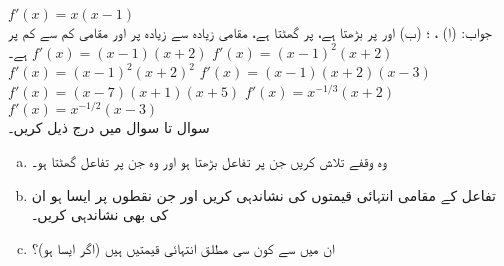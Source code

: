 $f'(x)=x(x-1)$\\
جواب:\quad
(ا) ، ؛ (ب)  اور  پر بڑھتا ہے،  پر گھٹتا ہے، مقامی زیادہ سے زیادہ  پر اور مقامی کم سے کم  پر ہے۔
$f'(x)=(x-1)(x+2)$
$f'(x)=(x-1)^2(x+2)$
$f'(x)=(x-1)^2(x+2)^2$
$f'(x)=(x-1)(x+2)(x-3)$
$f'(x)=(x-7)(x+1)(x+5)$
$f'(x)=x^{-1/3}(x+2)$
$f'(x)=x^{-1/2}(x-3)$
\\
سوال  تا سوال  میں درج ذیل کریں۔
\begin{enumerate}[a.]
\item
وہ وقفے تلاش کریں جن پر تفاعل بڑھتا ہو اور وہ جن پر تفاعل گھٹتا ہو۔
\item
 تفاعل کے مقامی انتہائی قیمتوں کی نشاندہی کریں اور جن نقطوں پر ایسا ہو ان کی بھی نشاندہی کریں۔
\item
ان میں سے کون سی  مطلق انتہائی قیمتیں ہیں (اگر ایسا ہو)؟
\end{enumerate}

